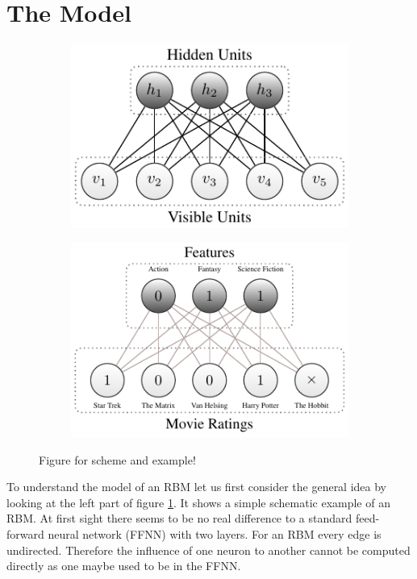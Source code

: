 \documentclass[crop=false,10pt]{standalone}
\begin{document}
  \section{The Model} %
  \label{sec:The Model}
    \begin{figure}[h]
      \center
      \begin{subfigure}[c]{0.49\textwidth}
        \center
        \includegraphics[scale=1]{figures/rbm-scheme-inputs.pdf}
      \end{subfigure}
      \begin{subfigure}[c]{0.49\textwidth}
        \center
        \includegraphics[scale=1]{figures/rbm-scheme-example.pdf}
      \end{subfigure}
      \caption{%
        Figure for scheme and example!
      }
      \label{fig:rbm-scheme-and-example}
    \end{figure}
    To understand the model of an RBM let us first consider the general idea by looking at the left part of figure \ref{fig:rbm-scheme-and-example}.
    It shows a simple schematic example of an RBM.
    At first sight there seems to be no real difference to a standard feed-forward neural network (FFNN) with two layers.
    For an RBM every edge is undirected.
    Therefore the influence of one neuron to another cannot be computed directly as one maybe used to be in the FFNN.
\end{document}
